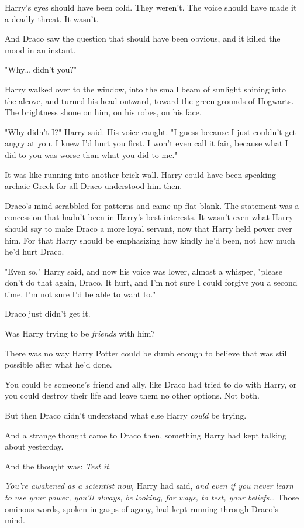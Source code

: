 Harry's eyes should have been cold. They weren't. The voice should have made it
a deadly threat. It wasn't.

And Draco saw the question that should have been obvious, and it killed the
mood in an instant.

"Why{\ldots} didn't you?"

Harry walked over to the window, into the small beam of sunlight shining into
the alcove, and turned his head outward, toward the green grounds of Hogwarts.
The brightness shone on him, on his robes, on his face.

"Why didn't I?" Harry said. His voice caught. "I guess because I just couldn't
get angry at you. I knew I'd hurt you first. I won't even call it fair, because
what I did to you was worse than what you did to me."

It was like running into another brick wall. Harry could have been speaking
archaic Greek for all Draco understood him then.

Draco's mind scrabbled for patterns and came up flat blank. The statement was a
concession that hadn't been in Harry's best interests. It wasn't even what
Harry should say to make Draco a more loyal servant, now that Harry held power
over him. For that Harry should be emphasizing how kindly he'd been, not how
much he'd hurt Draco.

"Even so," Harry said, and now his voice was lower, almost a whisper, "please
don't do that again, Draco. It hurt, and I'm not sure I could forgive you a
second time. I'm not sure I'd be able to want to."

Draco just didn't get it.

Was Harry trying to be \emph{friends} with him?

There was no way Harry Potter could be dumb enough to believe that was still
possible after what he'd done.

You could be someone's friend and ally, like Draco had tried to do with Harry,
or you could destroy their life and leave them no other options. Not both.

But then Draco didn't understand what else Harry \emph{could} be trying.

And a strange thought came to Draco then, something Harry had kept talking
about yesterday.

And the thought was: \emph{Test it.}

\emph{You're awakened as a scientist now,} Harry had said, \emph{and even if
you never learn to use your power, you'll always, be looking, for ways, to
test, your beliefs{\ldots}} Those ominous words, spoken in gasps of agony, had
kept running through Draco's mind.

